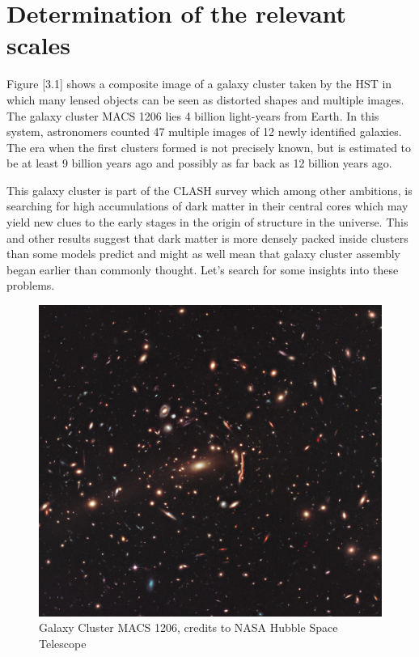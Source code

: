 \chapter{Determination of the relevant scales}

Figure [3.1] shows a composite image of a galaxy cluster taken by the HST in which many lensed objects can be seen as distorted shapes and multiple images. The galaxy cluster MACS 1206 lies 4 billion light-years from Earth. In this system, astronomers counted 47 multiple images of 12 newly identified galaxies. The era when the first clusters formed is not precisely known, but is estimated to be at least 9 billion years ago and possibly as far back as 12 billion years ago.

This galaxy cluster is part of the CLASH survey which among other ambitions, is searching for high accumulations of dark matter in their central cores which may yield new clues to the early stages in the origin of structure in the universe. This and other results suggest that dark matter is more densely packed inside clusters than some models predict and might as well mean that galaxy cluster assembly began earlier than commonly thought. Let's search for some insights into these problems.

\begin{figure}[H]
\centering
\includegraphics[width=12cm]{images/GC.jpg}
\caption[Galaxy Cluster MACS 1206]{Galaxy Cluster MACS 1206, credits to NASA Hubble Space Telescope}
\end{figure}

